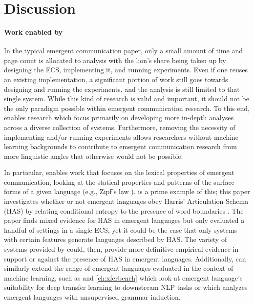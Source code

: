 \section{Discussion}
\unskip\label{elcc:sec:discussion}


\paragraph{Work enabled by \theLib{}}
In the typical emergent communication paper, only a small amount of time and page count is allocated to analysis with the lion's share being taken up by designing the ECS, implementing it, and running experiments.
Even if one reuses an existing implementation, a significant portion of work still goes towards designing and running the experiments, and the analysis is still limited to that single system.
While this kind of research is valid and important, it should not be the only paradigm possible within emergent communication research.
To this end, \theLib{} enables research which focus primarily on developing more in-depth analyses across a diverse collection of systems.
Furthermore, removing the necessity of implementing and/or running experiments allows researchers without machine learning backgrounds to contribute to emergent communication research from more linguistic angles that otherwise would not be possible.

In particular, \theLib{} enables work that focuses on the lexical properties of emergent communication, looking at the statical properties and patterns of the surface forms of a given language (e.g., Zipf's law \citep{zipf}).
\citet{ueda2023on} is a prime example of this; this paper investigates whether or not emergent languages obey Harris' Articulation Schema (HAS) by relating conditional entropy to the presence of word boundaries \citep{harris,Tanaka-Ishii2021}.
The paper finds mixed evidence for HAS in emergent languages but only evaluated a handful of settings in a single ECS\@, yet it could be the case that only systems with certain features generate languages described by HAS\@.
The variety of systems provided by \theLib{} could, then, provide more definitive empirical evidence in support or against the presence of HAS in emergent languages.
Additionally, \theLib{} can similarly extend the range of emergent languages evaluated in the context of machine learning, such as \citet{yao2022linking} and \cref{ch:xferbench} which look at emergent language's suitability for deep transfer learning to downstream NLP tasks or \citet{van-der-wal-etal-2020-grammar} which analyzes emergent languages with unsupervised grammar induction.

